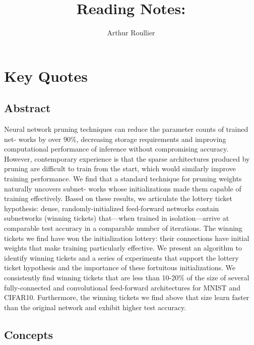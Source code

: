 \documentclass{article}
\title{Reading Notes: \cite{frankle_lottery_2018}}
\author{Arthur Roullier}
\begin{document}
\maketitle




\section{Key Quotes}


\subsection{Abstract}
Neural network pruning techniques can reduce the parameter counts of trained net- works by over 90\%, decreasing storage requirements and improving computational performance of inference without compromising accuracy. However, contemporary experience is that the sparse architectures produced by pruning are difficult to train from the start, which would similarly improve training performance.
We find that a standard technique for pruning weights naturally uncovers subnet- works whose initializations made them capable of training effectively. Based on these results, we articulate the lottery ticket hypothesis: dense, randomly-initialized feed-forward networks contain subnetworks (winning tickets) that—when trained in isolation—arrive at comparable test accuracy in a comparable number of iterations. The winning tickets we find have won the initialization lottery: their connections have initial weights that make training particularly effective.
We present an algorithm to identify winning tickets and a series of experiments that support the lottery ticket hypothesis and the importance of these fortuitous initializations. We consistently find winning tickets that are less than 10-20\% of the size of several fully-connected and convolutional feed-forward architectures for MNIST and CIFAR10. Furthermore, the winning tickets we find above that size learn faster than the original network and exhibit higher test accuracy.


\subsection{Concepts}
\end{document}
